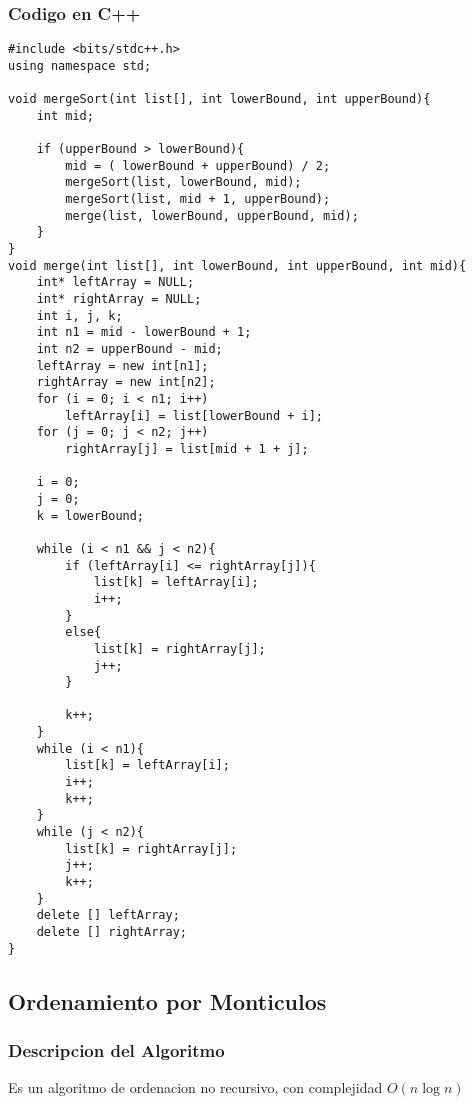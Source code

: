 \subsubsection{Codigo en C++}
\begin{lstlisting}[style=Cpp, label=MergeSort, caption=Merge Sort]
#include <bits/stdc++.h>
using namespace std;

void mergeSort(int list[], int lowerBound, int upperBound){
    int mid;

    if (upperBound > lowerBound){
        mid = ( lowerBound + upperBound) / 2;
        mergeSort(list, lowerBound, mid);
        mergeSort(list, mid + 1, upperBound);
        merge(list, lowerBound, upperBound, mid);
    }
}
void merge(int list[], int lowerBound, int upperBound, int mid){
    int* leftArray = NULL;
    int* rightArray = NULL;
    int i, j, k;
    int n1 = mid - lowerBound + 1;
    int n2 = upperBound - mid;
    leftArray = new int[n1];
    rightArray = new int[n2];
    for (i = 0; i < n1; i++)
        leftArray[i] = list[lowerBound + i];
    for (j = 0; j < n2; j++)
        rightArray[j] = list[mid + 1 + j];

    i = 0;
    j = 0;
    k = lowerBound;

    while (i < n1 && j < n2){
        if (leftArray[i] <= rightArray[j]){
            list[k] = leftArray[i];
            i++;
        }
        else{
            list[k] = rightArray[j];
            j++;
        }

        k++;
    }
    while (i < n1){
        list[k] = leftArray[i];
        i++;
        k++;
    }
    while (j < n2){
        list[k] = rightArray[j];
        j++;
        k++;
    }
    delete [] leftArray;
    delete [] rightArray;
}
\end{lstlisting}

\subsection{Ordenamiento por Monticulos}

\subsubsection{Descripcion del Algoritmo}

Es un algoritmo de ordenacion no recursivo, con complejidad $ O(n \log n) $

